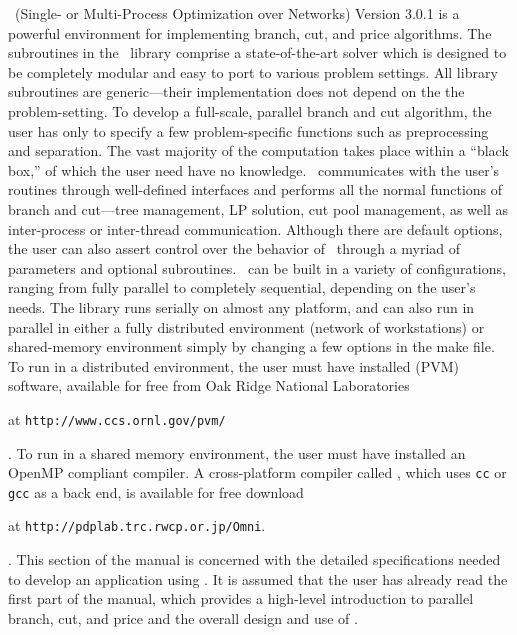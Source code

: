 \BB\ (Single- or Multi-Process Optimization over Networks) Version 3.0.1
is a powerful environment for implementing branch, cut, and price
algorithms. The subroutines in the \BB\ library comprise a
state-of-the-art solver which is designed to be completely modular and
easy to port to various problem settings. All library subroutines are
generic---their implementation does not depend on the the
problem-setting. To develop a full-scale, parallel branch and cut
algorithm, the user has only to specify a few problem-specific
functions such as preprocessing and separation. The vast majority of
the computation takes place within a ``black box,'' of which the user
need have no knowledge. \BB\ communicates with the user's routines
through well-defined interfaces and performs all the normal functions
of branch and cut---tree management, LP solution, cut pool management,
as well as inter-process or inter-thread communication. Although there
are default options, the user can also assert control over the
behavior of \BB\ through a myriad of parameters and optional
subroutines. \BB\ can be built in a variety of configurations, ranging
from fully parallel to completely sequential, depending on the user's
needs. The library runs serially on almost any platform, and can also
run in parallel in either a fully distributed environment (network of
workstations) or shared-memory environment simply by changing a few
options in the make file. To run in a distributed environment, the
user must have installed {\em {}} (PVM) software, available for
free from Oak Ridge National Laboratories
\begin{latexonly}
at {\tt http://www.ccs.ornl.gov/pvm/} 
\end{latexonly}. 
To run in a shared memory environment, the user must have installed an
OpenMP compliant compiler. A cross-platform compiler called {\em
{}}, which uses 
{\tt cc} or {\tt gcc} as a back end, is available for free download
\begin{latexonly}
at {\tt http://pdplab.trc.rwcp.or.jp/Omni}.
\end{latexonly}.
This section of the manual is concerned with the detailed
specifications needed to develop an application using \BB. It is
assumed that the user has already read the first part of the manual, which
provides a high-level introduction to parallel branch, cut, and price
and the overall design and use of \BB. 

